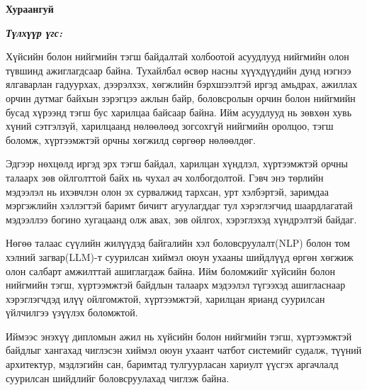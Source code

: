 

\begin{center}
{\scshape\Large \univname\par} %
{\scshape\large \facname\par}\vspace{0.5cm} %
{\huge\textbf{{Хураангуй}} \par}
\bigskip
{\Large{\ttitle} \par} %
\bigskip

{\normalsize \shortname \par} %
\addressname
\end{center}

\textit{\textbf{Түлхүүр үгс: \keywordnames}}
\bigskip

Хүйсийн болон нийгмийн тэгш байдалтай холбоотой асуудлууд нийгмийн олон түвшинд ажиглагдсаар байна. Тухайлбал өсвөр насны хүүхдүүдийн дунд нэгнээ ялгаварлан гадуурхах, дээрэлхэх, хөгжлийн бэрхшээлтэй иргэд амьдрах, ажиллах орчин дутмаг байхын зэрэгцээ ажлын байр, боловсролын орчин болон нийгмийн бусад хүрээнд тэгш бус харилцаа байсаар байна. Ийм асуудлууд нь зөвхөн хувь хүний сэтгэлзүй, харилцаанд нөлөөлөөд зогсохгүй нийгмийн оролцоо, тэгш боломж, хүртээмжтэй орчны хөгжилд сөргөөр нөлөөлдөг.

Эдгээр нөхцөлд иргэд эрх тэгш байдал, харилцан хүндлэл, хүртээмжтэй орчны талаарх зөв ойлголттой байх нь чухал ач холбогдолтой. Гэвч энэ төрлийн мэдээлэл нь ихэвчлэн олон эх сурвалжид тархсан, урт хэлбэртэй, заримдаа мэргэжлийн хэллэгтэй баримт бичигт агуулагддаг тул хэрэглэгчид шаардлагатай мэдээллээ богино хугацаанд олж авах, зөв ойлгох, хэрэглэхэд хүндрэлтэй байдаг.

Нөгөө талаас сүүлийн жилүүдэд байгалийн хэл боловсруулалт(NLP) болон том хэлний загвар(LLM)-т суурилсан хиймэл оюун ухааны шийдлүүд өргөн хөгжиж олон салбарт амжилттай ашиглагдаж байна. Ийм боломжийг хүйсийн болон нийгмийн тэгш, хүртээмжтэй байдлын талаарх мэдээлэл түгээхэд ашигласнаар хэрэглэгчдэд илүү ойлгомжтой, хүртээмжтэй, харилцан ярианд суурилсан үйлчилгээ үзүүлэх боломжтой.

Иймээс энэхүү дипломын ажил нь хүйсийн болон нийгмийн тэгш, хүртээмжтэй байдлыг хангахад чиглэсэн хиймэл оюун ухаант чатбот системийг судалж, түүний архитектур, мэдлэгийн сан, баримтад тулгуурласан хариулт үүсгэх аргачлалд суурилсан шийдлийг боловсруулахад чиглэж байна.



